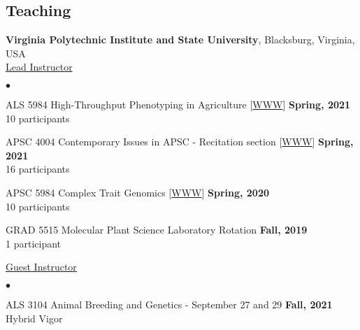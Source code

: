 \documentclass[margin,line,10pt]{res}
\newenvironment{list2}{
  \begin{list}{$\bullet$}{%
      \setlength{\itemsep}{0in}
      \setlength{\parsep}{0in} \setlength{\parskip}{0in}
      \setlength{\topsep}{0in} \setlength{\partopsep}{0in} 
      \setlength{\leftmargin}{0.2in}}}{\end{list}}
\begin{document}
\begin{resume}
\section{\sc Teaching}
{\bf Virginia Polytechnic Institute and State University}, Blacksburg, Virginia, USA  \vspace{0.2cm} \\
\underline{Lead Instructor}
\vspace{0.4cm}
\begin{list2}


  \item ALS 5984 High-Throughput Phenotyping in Agriculture [\textcolor{blue}{\href{}{WWW}}] 
  \hfill {\bf Spring, 2021} \\
         10  participants 
  
         \vspace{0.5cm}

         
  \item APSC 4004 Contemporary Issues in APSC - Recitation section [\textcolor{blue}{\href{}{WWW}}] 
  \hfill {\bf Spring, 2021} \\
         16  participants 
  
         \vspace{0.5cm}
         
\item APSC 5984 Complex Trait Genomics [\textcolor{blue}{\href{http://morotalab.org/apsc5984-2020/APSC5984.html}{WWW}}] 
  \hfill {\bf Spring, 2020} \\
         10  participants %
  
     \vspace{0.5cm}

     
\item GRAD 5515 Molecular Plant Science Laboratory Rotation
  \hfill {\bf Fall, 2019} \\
  1 participant

\end{list2}

     \vspace{0.3cm}


\underline{Guest Instructor}

\vspace{0.4cm}
 \begin{list2}
 \item ALS 3104 Animal Breeding and Genetics  - September 27 and 29  \hfill {\bf Fall, 2021} \\
   Hybrid Vigor 
\end{list2}


\end{resume}
\end{document}
